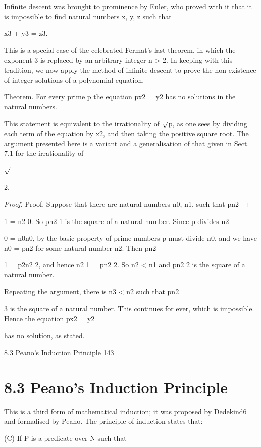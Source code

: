 \documentclass[11pt]{article}
\theoremstyle{plain}
\theoremstyle{definition}
\begin{document}
Infinite descent was brought to prominence by Euler, who proved with it that it is impossible to find natural numbers x, y, z such that

x3 + y3 = z3.

This is a special case of the celebrated Fermat's last theorem, in which the exponent 3 is replaced by an arbitrary integer n > 2. In keeping with this tradition, we now apply the method of infinite descent to prove the non-existence of integer solutions of a polynomial equation.

Theorem. For every prime p the equation px2 = y2 has no solutions in the natural numbers.

This statement is equivalent to the irrationality of $\surd$p, as one sees by dividing each term of the equation by x2, and then taking the positive square root. The argument presented here is a variant and a generalisation of that given in Sect. 7.1 for the irrationality of

$\surd$

2.

\begin{proof}
Proof. Suppose that there are natural numbers n0, n1, such that pn2
\end{proof}

1 = n2 0. So pn2 1 is the square of a natural number. Since p divides n2

0 = n0n0, by the basic property of prime numbers p must divide n0, and we have n0 = pn2 for some natural number n2. Then pn2

1 = p2n2 2, and hence n2 1 = pn2 2. So n2 < n1 and pn2 2 is the square of a natural number.

Repeating the argument, there is n3 < n2 such that pn2

3 is the square of a natural number. This continues for ever, which is impossible. Hence the equation px2 = y2

has no solution, as stated. 

8.3 Peano's Induction Principle 143

\section{8.3 Peano's Induction Principle}

This is a third form of mathematical induction; it was proposed by Dedekind6 and formalised by Peano. The principle of induction states that:

(C) If P is a predicate over N such that
\end{document}
